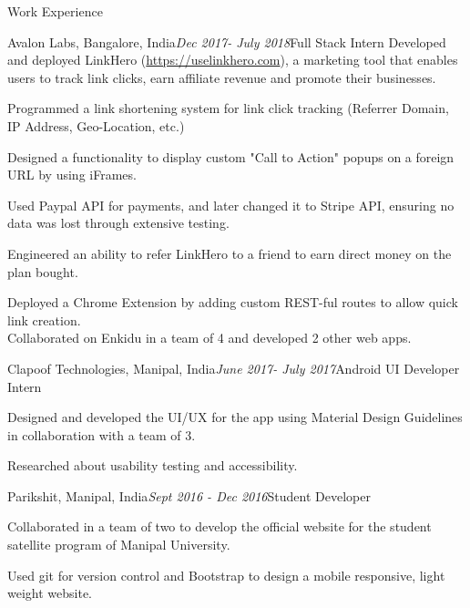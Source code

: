 \documentclass{resume} %
\begin{document}
\begin{rSection}{Work Experience}

    \begin{rSubsection}{Avalon Labs, Bangalore, India}{\em Dec 2017- July 2018}{Full Stack Intern}{}
    Developed and deployed LinkHero (\url{https://uselinkhero.com}), a marketing tool that enables users to track link clicks, earn affiliate revenue and promote their businesses.
    \item
    Programmed a link shortening system for link click tracking (Referrer Domain, IP Address, Geo-Location, etc.)
    \item 
    Designed a functionality to display custom "Call to Action" popups on a foreign URL by using iFrames.
    \item 
    Used Paypal API for payments, and later changed it to Stripe API, ensuring no data was lost through extensive testing.
    \item 
    Engineered an ability to refer LinkHero to a friend to earn direct money on the plan bought. 
    \item
    Deployed a Chrome Extension by adding custom REST-ful routes to allow quick link creation.\\
    Collaborated on Enkidu in a team of 4 and developed 2 other web apps.
    \end{rSubsection}
    
    \begin{rSubsection}{Clapoof Technologies, Manipal, India}{\em June 2017- July 2017}{Android UI Developer Intern}{}
    \item Designed and developed the UI/UX for the app using Material Design Guidelines in collaboration with a team of 3.
    \item Researched about usability testing and accessibility.
    \end{rSubsection}
    
    \begin{rSubsection}{Parikshit, Manipal, India}{\em Sept 2016 - Dec 2016}{Student Developer}{}
    \item Collaborated in a team of two to develop the official website for the student satellite program of Manipal University.
    \item Used git for version control and Bootstrap to design a mobile responsive, light weight website. 
    \end{rSubsection}
\end{rSection}
\end{document}

